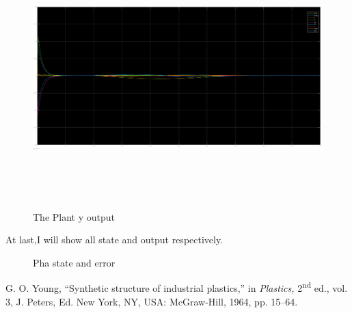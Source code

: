 \documentclass[12pt, a4paper]{article}
\begin{document}
\begin{enumerate}[1.]
\begin{figure}[H]
    \centering
    \includegraphics[width=20cm,height=10cm,scale=0.6]{state_output.png}
    \caption{The Plant y output}
    \label{fig:label}
    \end{figure}
At last,I will show all state and output respectively.
\begin{figure}[H]
        \centering
        \qquad
        \caption{Pha state and error}
        \label{fig:example}%
    \end{figure}




\end{enumerate}
\begin{thebibliography}{00}

     G. O. Young, ``Synthetic structure of industrial plastics,'' in \emph{Plastics,} 2\textsuperscript{nd} ed., vol. 3, J. Peters, Ed. New York, NY, USA: McGraw-Hill, 1964, pp. 15--64.
    
\end{thebibliography}
\end{document}
